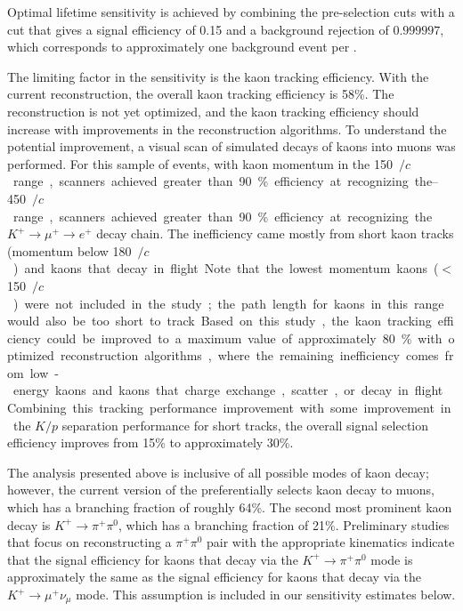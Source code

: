 Optimal lifetime sensitivity is achieved by combining the pre-selection cuts with a  cut that gives a signal efficiency of \num{0.15} and a background rejection of 
$0.999997$,
which corresponds to approximately one background event per \si{\Mtyr}. 

The limiting factor in the sensitivity is the kaon tracking efficiency.  With the current reconstruction, 
the overall kaon tracking efficiency is \num{58}\%.
The reconstruction is not yet optimized, and the kaon tracking efficiency should increase with improvements in the reconstruction algorithms.  
To understand the potential improvement, a visual scan of simulated decays of kaons into muons was performed. For this sample of events, with kaon momentum in the \SIrange{150}{450}{\MeV$/c$} range, scanners achieved greater than \num{90}\% efficiency at recognizing the $K^{+} \rightarrow \mu^{+} \rightarrow e^{+}$ decay chain.  The inefficiency came mostly from short kaon tracks (momentum below \SI{180}{\MeV$/c$}) and kaons that decay in flight. Note that the lowest momentum kaons ($<$\SI{150}{\MeV$/c$}) were not included in the study; the path length for kaons in this range would also be too short to track.  Based on this study, the kaon tracking efficiency could be improved to a maximum value of approximately \num{80}\% with optimized reconstruction algorithms, where the remaining inefficiency comes from low-energy kaons and kaons that charge exchange, scatter, or decay in flight.
Combining this tracking performance improvement with some improvement in the $K/p$ separation performance for short tracks, the overall signal selection efficiency improves from \num{15}\% to approximately \num{30}\%.

The analysis presented above is inclusive of all possible modes of kaon decay; however, the current version of the  preferentially selects kaon decay to muons, which has a branching fraction of roughly \num{64}\%. The second most prominent kaon decay is $K^{+} \rightarrow \pi^{+}\pi^0$, which has a branching fraction of \num{21}\%.  Preliminary studies that focus on reconstructing a $\pi^{+}\pi^0$ pair with the appropriate kinematics indicate that the signal efficiency for kaons that decay via the $K^{+} \rightarrow \pi^{+}\pi^0$ mode is approximately the same as the signal efficiency for kaons that decay via the $K^{+} \rightarrow \mu^{+}\nu_{\mu}$ mode.  This assumption is included in our sensitivity estimates below.

